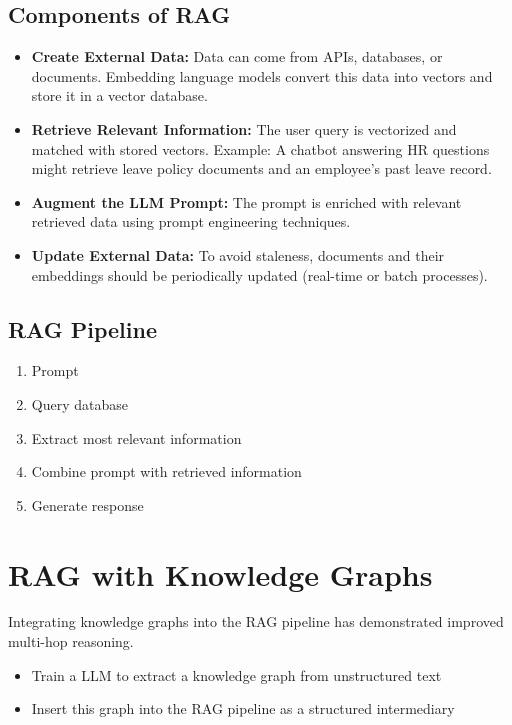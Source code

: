 \documentclass[12pt]{article}
\begin{document}
\subsection*{Components of RAG}

\begin{itemize}
    \item \textbf{Create External Data:} Data can come from APIs, databases, or documents. Embedding language models convert this data into vectors and store it in a vector database.
    
    \item \textbf{Retrieve Relevant Information:} The user query is vectorized and matched with stored vectors. Example: A chatbot answering HR questions might retrieve leave policy documents and an employee’s past leave record.

    \item \textbf{Augment the LLM Prompt:} The prompt is enriched with relevant retrieved data using prompt engineering techniques.

    \item \textbf{Update External Data:} To avoid staleness, documents and their embeddings should be periodically updated (real-time or batch processes).
\end{itemize}

\subsection*{RAG Pipeline}
\begin{enumerate}
    \item Prompt
    \item Query database
    \item Extract most relevant information
    \item Combine prompt with retrieved information
    \item Generate response
\end{enumerate}

\section{RAG with Knowledge Graphs}

Integrating knowledge graphs into the RAG pipeline has demonstrated improved multi-hop reasoning.

\begin{itemize}
    \item Train a LLM to extract a knowledge graph from unstructured text
    \item Insert this graph into the RAG pipeline as a structured intermediary
\end{itemize}
\end{document}
